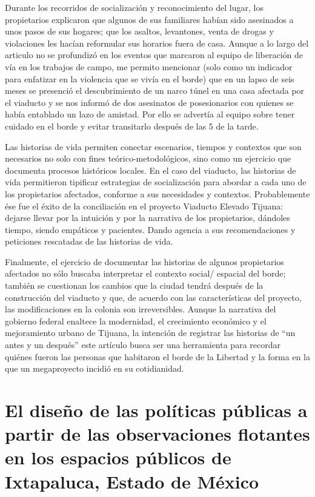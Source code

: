 \documentclass[
  spanish,
  11pt,
  a4paper,
]{scrbook}
\begin{document}
Durante los recorridos de socialización y reconocimiento del lugar, los
propietarios explicaron que algunos de sus familiares habían sido
asesinados a unos pasos de sus hogares; que los asaltos, levantones,
venta de drogas y violaciones les hacían reformular sus horarios fuera
de casa. Aunque a lo largo del articulo no se profundizó en los eventos
que marcaron al equipo de liberación de vía en los trabajos de campo, me
permito mencionar (solo como un indicador para enfatizar en la violencia
que se vivía en el borde) que en un lapso de seis meses se presenció el
descubrimiento de un narco túnel en una casa afectada por el viaducto y
se nos informó de dos asesinatos de posesionarios con quienes se había
entablado un lazo de amistad. Por ello se advertía al equipo sobre tener
cuidado en el borde y evitar transitarlo después de las 5 de la tarde.

Las historias de vida permiten conectar escenarios, tiempos y contextos
que son necesarios no solo con fines teórico-metodológicos, sino como un
ejercicio que documenta procesos históricos locales. En el caso del
viaducto, las historias de vida permitieron tipificar estrategias de
socialización para abordar a cada uno de los propietarios afectados,
conforme a sus necesidades y contextos. Probablemente ése fue el éxito
de la conciliación en el proyecto Viaducto Elevado Tijuana: dejarse
llevar por la intuición y por la narrativa de los propietarios, dándoles
tiempo, siendo empáticos y pacientes. Dando agencia a sus
recomendaciones y peticiones rescatadas de las historias de vida.

Finalmente, el ejercicio de documentar las historias de algunos
propietarios afectados no sólo buscaba interpretar el contexto social/
espacial del borde; también se cuestionan los cambios que la ciudad
tendrá después de la construcción del viaducto y que, de acuerdo con las
características del proyecto, las modificaciones en la colonia son
irreversibles. Aunque la narrativa del gobierno federal enaltece la
modernidad, el crecimiento económico y el mejoramiento urbano de
Tijuana, la intención de registrar las historias de ``un antes y un
después'' este artículo busca ser una herramienta para recordar quiénes
fueron las personas que habitaron el borde de la Libertad y la forma en
la que un megaproyecto incidió en su cotidianidad.

\printbibliography[heading=subbibliography, title={Referencias Bibliográficas}]


\chapter{El diseño de las políticas públicas a partir de las
observaciones flotantes en los espacios públicos de Ixtapaluca, Estado
de
México}\label{el-diseuxf1o-de-las-poluxedticas-puxfablicas-a-partir-de-las-observaciones-flotantes-en-los-espacios-puxfablicos-de-ixtapaluca-estado-de-muxe9xico}
\end{document}

